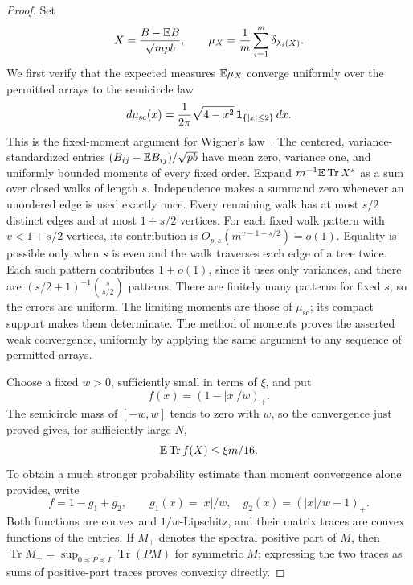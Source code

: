 \begin{proof}
Set
\[
 X=\frac{B-\mathbb E B}{\sqrt{mpb}},\qquad
 \mu_X=\frac1m\sum_{i=1}^m\delta_{\lambda_i(X)}.
\]
We first verify that the expected measures \(\mathbb E\mu_X\) converge
uniformly over the permitted arrays to the semicircle law
\[
 d\mu_{\mathrm{sc}}(x)=\frac1{2\pi}\sqrt{4-x^2}\,
                       \mathbf 1_{\{|x|\le2\}}\,dx.
\]
This is the fixed-moment argument for Wigner's law~\cite{Wigner}.
The centered, variance-standardized entries
\((B_{ij}-\mathbb E B_{ij})/\sqrt{pb}\) have mean zero, variance one, and
uniformly bounded moments of every fixed order. Expand
\(m^{-1}\mathbb E\operatorname{Tr}X^s\) as a sum over closed walks of length
\(s\). Independence makes a summand zero whenever an unordered edge
is used exactly once. Every remaining walk has at most \(s/2\)
distinct edges and at most \(1+s/2\) vertices. For each fixed walk
pattern with \(v<1+s/2\) vertices, its contribution is
\(O_{p,s}(m^{v-1-s/2})=o(1)\). Equality is possible only when \(s\)
is even and the walk traverses each edge of a tree twice. Each such
pattern contributes \(1+o(1)\), since it uses only variances, and
there are \((s/2+1)^{-1}\binom{s}{s/2}\) patterns. There are finitely
many patterns for fixed \(s\), so the errors are uniform. The limiting
moments are those of \(\mu_{\mathrm{sc}}\); its compact support makes
them determinate. The method of moments proves the asserted weak
convergence, uniformly by applying the same argument to any sequence of
permitted arrays.

Choose a fixed \(w>0\), sufficiently small in terms of \(\xi\), and
put
\[
 f(x)=(1-|x|/w)_+.
\]
The semicircle mass of \([-w,w]\) tends to zero with \(w\), so the
convergence just proved gives, for sufficiently large \(N\),
\begin{equation}\label{eq:typical-tent-mean}
 \mathbb E\operatorname{Tr}f(X)\le\xi m/16.
\end{equation}
To obtain a much stronger probability estimate than moment convergence
alone provides, write
\[
 f=1-g_1+g_2,\qquad
 g_1(x)=|x|/w,\quad g_2(x)=(|x|/w-1)_+.
\]
Both functions are convex and \(1/w\)-Lipschitz, and their matrix
traces are convex functions of the entries. If \(M_+\) denotes the
spectral positive part of \(M\), then
\(\operatorname{Tr}M_+=\sup_{0\preceq P\preceq I}\operatorname{Tr}(PM)\)
for symmetric \(M\); expressing the two traces as sums of positive-part
traces proves convexity directly.


\end{proof}
